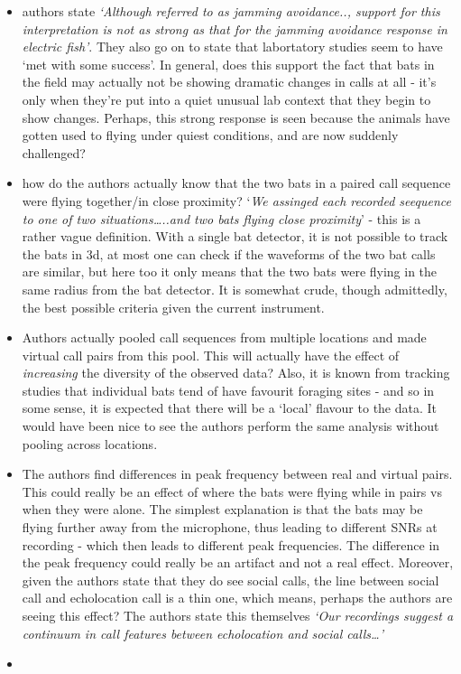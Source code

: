 \documentclass[
]{book}
\begin{document}
\begin{itemize}
\item
  authors state \emph{`Although referred to as jamming avoidance.., support for this interpretation is not as strong as that for the jamming avoidance response in electric fish'}. They also go on to state that labortatory studies seem to have `met with some success'. In general, does this support the fact that bats in the field may actually not be showing dramatic changes in calls at all - it's only when they're put into a quiet unusual lab context that they begin to show changes. Perhaps, this strong response is seen because the animals have gotten used to flying under quiest conditions, and are now suddenly challenged?
\item
  how do the authors actually know that the two bats in a paired call sequence were flying together/in close proximity? `\emph{We assinged each recorded seequence to one of two situations\ldots..and two bats flying close proximity}' - this is a rather vague definition. With a single bat detector, it is not possible to track the bats in 3d, at most one can check if the waveforms of the two bat calls are similar, but here too it only means that the two bats were flying in the same radius from the bat detector. It is somewhat crude, though admittedly, the best possible criteria given the current instrument.
\item
  Authors actually pooled call sequences from multiple locations and made virtual call pairs from this pool. This will actually have the effect of \emph{increasing} the diversity of the observed data? Also, it is known from tracking studies that individual bats tend of have favourit foraging sites - and so in some sense, it is expected that there will be a `local' flavour to the data. It would have been nice to see the authors perform the same analysis without pooling across locations.
\item
  The authors find differences in peak frequency between real and virtual pairs. This could really be an effect of where the bats were flying while in pairs vs when they were alone. The simplest explanation is that the bats may be flying further away from the microphone, thus leading to different SNRs at recording - which then leads to different peak frequencies. The difference in the peak frequency could really be an artifact and not a real effect. Moreover, given the authors state that they do see social calls, the line between social call and echolocation call is a thin one, which means, perhaps the authors are seeing this effect? The authors state this themselves \emph{`Our recordings suggest a continuum in call features between echolocation and social calls\ldots{}'}
\item
\end{itemize}
\end{document}

